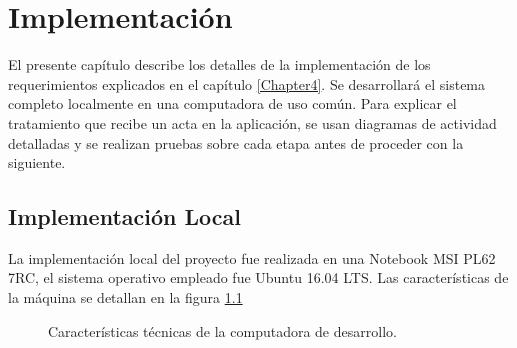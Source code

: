 \chapter{Implementación} %
\label{Chapter5}
El presente capítulo describe los detalles de la implementación de los requerimientos explicados en el capítulo \ref{Chapter4}. %
Se desarrollará el sistema completo localmente en una computadora de uso común. Para explicar el tratamiento que recibe un acta en la aplicación, se usan diagramas de actividad detalladas y se realizan pruebas sobre cada etapa antes de proceder con la siguiente.

\section{Implementación Local}
La implementación local del proyecto fue realizada en una Notebook MSI PL62 7RC, el sistema operativo empleado fue Ubuntu 16.04 LTS. Las características de la máquina se detallan en la figura \ref{fig:msi_c5}
\begin{figure}
    \caption{Características técnicas de la computadora de desarrollo.}
    \label{fig:msi_c5}
\end{figure}

